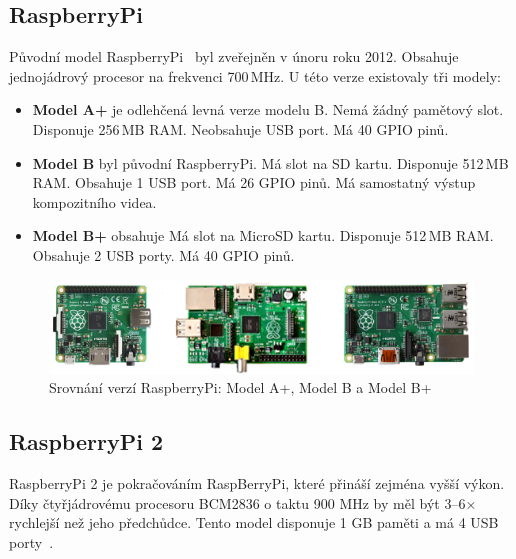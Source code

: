 	\subsection{RaspberryPi}
	Původní model RaspberryPi~\cite{RaspiOne} byl zveřejněn v únoru roku 2012. Obsahuje jednojádrový procesor na frekvenci 700\,MHz. U této verze existovaly tři modely:
	
		\begin{itemize}
		\item \textbf{Model A+} je odlehčená levná verze modelu B. Nemá žádný pamětový slot. Disponuje 256\,MB RAM. Neobsahuje USB port. Má 40 GPIO pinů.
		\item \textbf{Model B} byl původní RaspberryPi. Má slot na SD kartu. Disponuje 512\,MB RAM. Obsahuje 1 USB port. Má 26 GPIO pinů. Má samostatný výstup kompozitního videa.
		\item \textbf{Model B+} obsahuje   Má slot na MicroSD kartu. Disponuje 512\,MB RAM. Obsahuje 2 USB porty. Má 40 GPIO pinů.
	\end{itemize}
	
	\begin{figure}[!h]
  \begin{center}
    \includegraphics[scale=0.9]{obrazky/embed_raspi_1}
  \end{center}
  \caption{Srovnání verzí RaspberryPi: Model A+, Model B a Model B+~\cite{RaspiOne}}
\end{figure}
	
	\subsection{RaspberryPi 2}
	RaspberryPi 2 je pokračováním RaspBerryPi, které přináší zejména vyšší výkon. Díky čtyřjádrovému procesoru BCM2836 o taktu 900 MHz by měl být 3–6× rychlejší než jeho předchůdce. Tento model disponuje 1 GB paměti a má 4 USB porty~\cite{RaspiTwo}.
	

